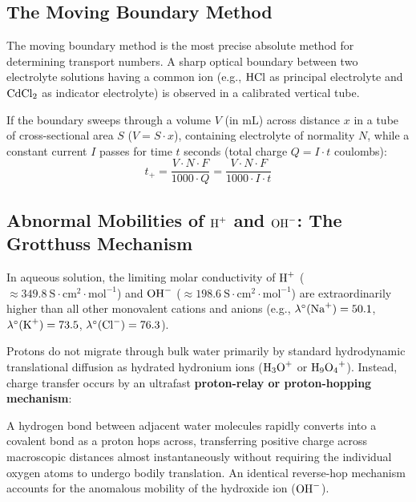 \subsection{The Moving Boundary Method}
The moving boundary method is the most precise absolute method for determining transport numbers. A sharp optical boundary between two electrolyte solutions having a common ion (e.g., $\ce{HCl}$ as principal electrolyte and $\ce{CdCl2}$ as indicator electrolyte) is observed in a calibrated vertical tube.

If the boundary sweeps through a volume $V$ (in $\text{mL}$) across distance $x$ in a tube of cross-sectional area $S$ ($V = S \cdot x$), containing electrolyte of normality $N$, while a constant current $I$ passes for time $t$ seconds (total charge $Q = I \cdot t$ coulombs):
\begin{equation}
    \boxed{t_+ = \frac{V \cdot N \cdot F}{1000 \cdot Q} = \frac{V \cdot N \cdot F}{1000 \cdot I \cdot t}}
\end{equation}

\subsection{Abnormal Mobilities of $\ce{H^+}$ and $\ce{OH^-}$: The Grotthuss Mechanism}
In aqueous solution, the limiting molar conductivity of $\ce{H^+}$ ($\approx 349.8\ \text{S}\cdot\text{cm}^2\cdot\text{mol}^{-1}$) and $\ce{OH^-}$ ($\approx 198.6\ \text{S}\cdot\text{cm}^2\cdot\text{mol}^{-1}$) are extraordinarily higher than all other monovalent cations and anions (e.g., $\lambda^\circ(\ce{Na+}) = 50.1$, $\lambda^\circ(\ce{K+}) = 73.5$, $\lambda^\circ(\ce{Cl-}) = 76.3$).

\begin{conceptbox}
Protons do not migrate through bulk water primarily by standard hydrodynamic translational diffusion as hydrated hydronium ions ($\ce{H3O+}$ or $\ce{H9O4+}$). Instead, charge transfer occurs by an ultrafast \textbf{proton-relay or proton-hopping mechanism}:
\begin{center}
\end{center}
A hydrogen bond between adjacent water molecules rapidly converts into a covalent bond as a proton hops across, transferring positive charge across macroscopic distances almost instantaneously without requiring the individual oxygen atoms to undergo bodily translation. An identical reverse-hop mechanism accounts for the anomalous mobility of the hydroxide ion ($\ce{OH^-}$).
\end{conceptbox}

